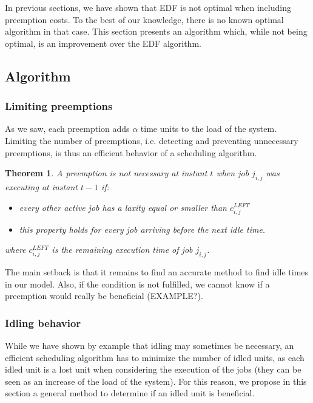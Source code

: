 \documentclass[a4paper,10pt]{article}
\newtheorem{theorem}{Theorem}
\begin{document}
    In previous sections, we have shown that EDF is not optimal when including preemption costs. To the best of our knowledge, there is no known optimal algorithm in that case. This section presents an algorithm which, while not being optimal, is an improvement over the EDF algorithm.

    \subsection{Algorithm}

    \subsubsection{Limiting preemptions}
    \label{sct:limPreemp}

        As we saw, each preemption adds $\alpha$ time units to the load of the system. Limiting the number of preemptions, i.e. detecting and preventing unnecessary preemptions, is thus an efficient behavior of a scheduling algorithm.\\

        \begin{theorem}
            \label{the:limPreemp}
            A preemption is not necessary at instant $t$ when job $j_{i,j}$ was executing at instant $t-1$ if:
            \begin{itemize}
                \item every other active job has a laxity equal or smaller than $c_{i,j}^{LEFT}$
                \item this property holds for every job arriving before the next idle time.
            \end{itemize}
            where $c_{i,j}^{LEFT}$ is the remaining execution time of job $j_{i,j}$.
        \end{theorem}

        The main setback is that it remains to find an accurate method to find idle times in our model. Also, if the condition is not fulfilled, we cannot know if a preemption would really be beneficial (EXAMPLE?).

    \subsubsection{Idling behavior}
    \label{sct:idlBehav}

        While we have shown by example that idling may sometimes be necessary, an efficient scheduling algorithm has to minimize the number of idled units, as each idled unit is a lost unit when considering the execution of the jobs (they can be seen as an increase of the load of the system). For this reason, we propose in this section a general method to determine if an idled unit is beneficial.\\
\end{document}
